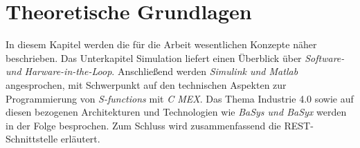\chapter{Theoretische Grundlagen} \label{grundlagen}
In diesem Kapitel werden die für die Arbeit wesentlichen Konzepte näher beschrieben. Das Unterkapitel Simulation liefert einen Überblick über \textit{Software- und Harware-in-the-Loop}. Anschließend werden \textit{Simulink und Matlab} angesprochen, mit Schwerpunkt auf den technischen Aspekten zur Programmierung von \textit{S-functions} mit \textit{C MEX}. Das Thema Industrie 4.0 sowie auf diesen bezogenen Architekturen und Technologien wie \textit{BaSys und BaSyx} werden in der Folge besprochen. Zum Schluss wird zusammenfassend die REST-Schnittstelle erläutert.







